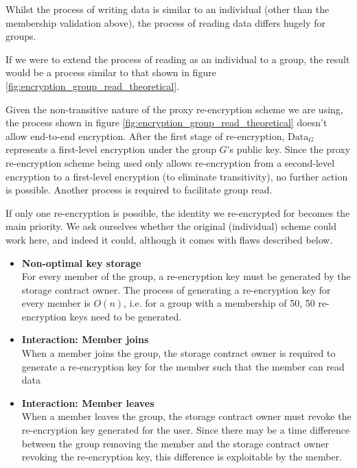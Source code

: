 Whilst the process of writing data is similar to an individual (other than the membership validation above), the process of reading data differs hugely for groups.

If we were to extend the process of reading as an individual to a group, the result would be a process similar to that shown in figure \ref{fig:encryption_group_read_theoretical}.



Given the non-transitive nature of the proxy re-encryption scheme we are using, the process shown in figure \ref{fig:encryption_group_read_theoretical} doesn't allow end-to-end encryption. After the first stage of re-encryption, $\text{Data}_{G}$ represents a first-level encryption under the group $G$'s public key. Since the proxy re-encryption scheme being used only allows re-encryption from a second-level encryption to a first-level encryption (to eliminate transitivity), no further action is possible. Another process is required to facilitate group read.

If only one re-encryption is possible, the identity we re-encrypted for becomes the main priority. We ask ourselves whether the original (individual) scheme could work here, and indeed it could, although it comes with flaws described below.

\begin{itemize}
  \item 
  	\textbf{Non-optimal key storage} \\
    For every member of the group, a re-encryption key must be generated by the storage contract owner. The process of generating a re-encryption key for every member is $O(n)$, i.e. for a group with a membership of 50, 50 re-encryption keys need to be generated.
  \item
  	\textbf{Interaction: Member joins} \\
    When a member joins the group, the storage contract owner is required to generate a re-encryption key for the member such that the member can read data
  \item
  	\textbf{Interaction: Member leaves} \\
    When a member leaves the group, the storage contract owner must revoke the re-encryption key generated for the user. Since there may be a time difference between the group removing the member and the storage contract owner revoking the re-encryption key, this difference is exploitable by the member.
\end{itemize}

